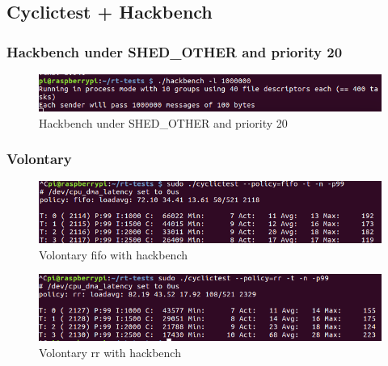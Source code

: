 \documentclass[10pt,a4paper]{article}
\begin{document}
\subsection{Cyclictest + Hackbench}
\subsubsection{Hackbench under SHED\_OTHER and priority 20}
\begin{figure}[H]
\includegraphics[width=16cm]{Volontary-other-Hackbench-p20.png}
\caption{Hackbench under SHED\_OTHER and priority 20}
\end{figure}
\subsubsection{Volontary}
\begin{figure}[H]
\includegraphics[width=16cm]{Volontary-Fifo-WithHackbench1.png}
\caption{Volontary fifo with hackbench}
\end{figure}
\begin{figure}[H]
\includegraphics[width=16cm]{Volontary-Rr-WithHackbench1.png}
\caption{Volontary rr with hackbench}
\end{figure}
\end{document}
